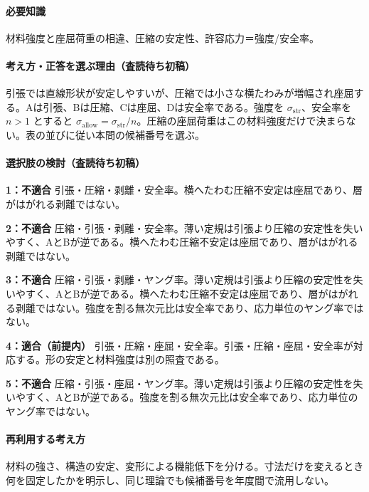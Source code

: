 \paragraph{必要知識} 材料強度と座屈荷重の相違、圧縮の安定性、許容応力＝強度/安全率。

\paragraph{考え方・正答を選ぶ理由（査読待ち初稿）} 引張では直線形状が安定しやすいが、圧縮では小さな横たわみが増幅され座屈する。Aは引張、Bは圧縮、Cは座屈、Dは安全率である。強度を \(\sigma_{\mathrm{str}}\)、安全率を \(n>1\) とすると \(\sigma_{\mathrm{allow}}=\sigma_{\mathrm{str}}/n\)。圧縮の座屈荷重はこの材料強度だけで決まらない。表の並びに従い本問の候補番号を選ぶ。

\paragraph{選択肢の検討（査読待ち初稿）}\mbox{}\par

\noindent\textbf{1：不適合} 引張・圧縮・剥離・安全率。横へたわむ圧縮不安定は座屈であり、層がはがれる剥離ではない。\par

\noindent\textbf{2：不適合} 圧縮・引張・剥離・安全率。薄い定規は引張より圧縮の安定性を失いやすく、AとBが逆である。横へたわむ圧縮不安定は座屈であり、層がはがれる剥離ではない。\par

\noindent\textbf{3：不適合} 圧縮・引張・剥離・ヤング率。薄い定規は引張より圧縮の安定性を失いやすく、AとBが逆である。横へたわむ圧縮不安定は座屈であり、層がはがれる剥離ではない。強度を割る無次元比は安全率であり、応力単位のヤング率ではない。\par

\noindent\textbf{4：適合（前提内）} 引張・圧縮・座屈・安全率。引張・圧縮・座屈・安全率が対応する。形の安定と材料強度は別の照査である。\par

\noindent\textbf{5：不適合} 圧縮・引張・座屈・ヤング率。薄い定規は引張より圧縮の安定性を失いやすく、AとBが逆である。強度を割る無次元比は安全率であり、応力単位のヤング率ではない。\par

\paragraph{再利用する考え方} 材料の強さ、構造の安定、変形による機能低下を分ける。寸法だけを変えるとき何を固定したかを明示し、同じ理論でも候補番号を年度間で流用しない。

